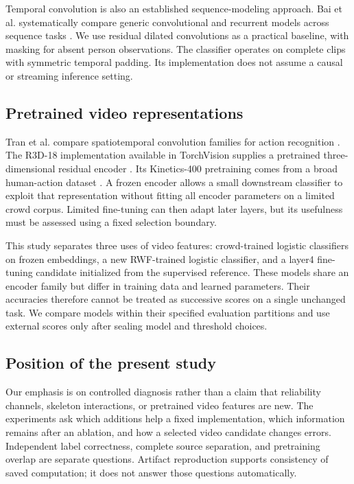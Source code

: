 \documentclass[journal]{IEEEtai}
\begin{document}
Temporal convolution is also an established sequence-modeling approach. Bai et al. systematically compare generic convolutional and recurrent models across sequence tasks \cite{bai2018}. We use residual dilated convolutions as a practical baseline, with masking for absent person observations. The classifier operates on complete clips with symmetric temporal padding. Its implementation does not assume a causal or streaming inference setting.

\subsection{Pretrained video representations}
Tran et al. compare spatiotemporal convolution families for action recognition \cite{tran2018}. The R3D-18 implementation available in TorchVision supplies a pretrained three-dimensional residual encoder \cite{torchvision}. Its Kinetics-400 pretraining comes from a broad human-action dataset \cite{kay2017}. A frozen encoder allows a small downstream classifier to exploit that representation without fitting all encoder parameters on a limited crowd corpus. Limited fine-tuning can then adapt later layers, but its usefulness must be assessed using a fixed selection boundary.

This study separates three uses of video features: crowd-trained logistic classifiers on frozen embeddings, a new RWF-trained logistic classifier, and a layer4 fine-tuning candidate initialized from the supervised reference. These models share an encoder family but differ in training data and learned parameters. Their accuracies therefore cannot be treated as successive scores on a single unchanged task. We compare models within their specified evaluation partitions and use external scores only after sealing model and threshold choices.

\subsection{Position of the present study}
Our emphasis is on controlled diagnosis rather than a claim that reliability channels, skeleton interactions, or pretrained video features are new. The experiments ask which additions help a fixed implementation, which information remains after an ablation, and how a selected video candidate changes errors. Independent label correctness, complete source separation, and pretraining overlap are separate questions. Artifact reproduction supports consistency of saved computation; it does not answer those questions automatically.
\end{document}
